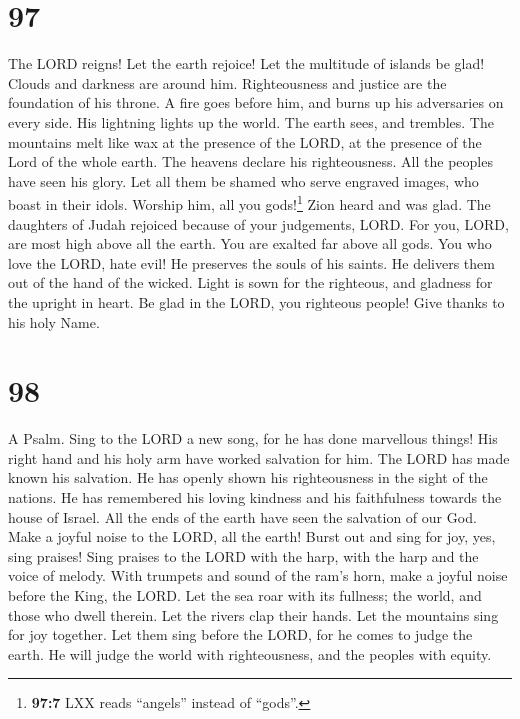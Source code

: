 \hypertarget{section-89}{%
\section{97}\label{section-89}}

 The LORD reigns! Let the earth rejoice! Let the multitude
of islands be glad!  Clouds and darkness are around him.
Righteousness and justice are the foundation of his throne.
 A fire goes before him, and burns up his adversaries on
every side.  His lightning lights up the world. The earth
sees, and trembles.  The mountains melt like wax at the
presence of the LORD, at the presence of the Lord of the whole earth.
 The heavens declare his righteousness. All the peoples
have seen his glory.  Let all them be shamed who serve
engraved images, who boast in their idols. Worship him, all you
gods!\footnote{\textbf{97:7} LXX reads ``angels'' instead of ``gods''.}
 Zion heard and was glad. The daughters of Judah rejoiced
because of your judgements, LORD.  For you, LORD, are most
high above all the earth. You are exalted far above all gods.
 You who love the LORD, hate evil! He preserves the souls
of his saints. He delivers them out of the hand of the wicked.
 Light is sown for the righteous, and gladness for the
upright in heart.  Be glad in the LORD, you righteous
people! Give thanks to his holy Name.

\hypertarget{section-90}{%
\section{98}\label{section-90}}

A Psalm.  Sing to the LORD a new song, for he has done
marvellous things! His right hand and his holy arm have worked salvation
for him.  The LORD has made known his salvation. He has
openly shown his righteousness in the sight of the nations.
 He has remembered his loving kindness and his
faithfulness towards the house of Israel. All the ends of the earth have
seen the salvation of our God.  Make a joyful noise to the
LORD, all the earth! Burst out and sing for joy, yes, sing praises!
 Sing praises to the LORD with the harp, with the harp and
the voice of melody.  With trumpets and sound of the ram's
horn, make a joyful noise before the King, the LORD.  Let
the sea roar with its fullness; the world, and those who dwell therein.
 Let the rivers clap their hands. Let the mountains sing
for joy together.  Let them sing before the LORD, for he
comes to judge the earth. He will judge the world with righteousness,
and the peoples with equity.

